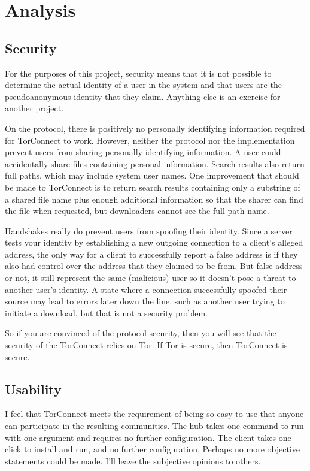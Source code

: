 \documentclass{article}
\begin{document}
\section{Analysis}
\subsection{Security}
For the purposes of this project, security means that it is not possible to determine the actual identity of a user in the system and that users are the pseudoanonymous identity that they claim.  Anything else is an exercise for another project.

On the protocol, there is positively no personally identifying information required for TorConnect to work.  However, neither the protocol nor the implementation prevent users from sharing personally identifying information.  A user could accidentally share files containing personal information.  Search results also return full paths, which may include system user names.  One improvement that should be made to TorConnect is to return search results containing only a substring of a shared file name plus enough additional information so that the sharer can find the file when requested, but downloaders cannot see the full path name.

Handshakes really do prevent users from spoofing their identity.  Since a server tests your identity by establishing a new outgoing connection to a client's alleged address, the only way for a client to successfully report a false address is if they also had control over the address that they claimed to be from.  But false address or not, it still represent the same (malicious) user so it doesn't pose a threat to another user's identity.  A state where a connection successfully spoofed their source may lead to errors later down the line, such as another user trying to initiate a download, but that is not a security problem.

So if you are convinced of the protocol security, then you will see that the security of the TorConnect relies on Tor.  If Tor is secure, then TorConnect is secure.

\subsection{Usability}
I feel that TorConnect meets the requirement of being so easy to use that anyone can participate in the resulting communities.  The hub takes one command to run with one argument and requires no further configuration.  The client takes one-click to install and run, and no further configuration.  Perhaps no more objective statements could be made.  I'll leave the subjective opinions to others.
\end{document}
